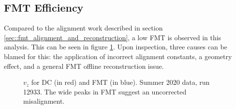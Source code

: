 \subsection{FMT Efficiency}
\label{ssec::fmt_efficiency}
    Compared to the alignment work described in section \ref{sec::fmt_alignment_and_reconstruction}, a low FMT is observed in this analysis.
    This can be seen in figure \ref{fig::vz_012933}.
    Upon inspection, three causes can be blamed for this: the application of incorrect alignment constants, a geometry effect, and a general FMT offline reconstruction issue.

    \begin{figure}[b!]
        \centering{}
        \caption[$v_z$ for DC and FMT, run 12933]{$v_z$ for DC (in red) and FMT (in blue). Summer 2020 data, run 12933. The wide peaks in FMT suggest an uncorrected misalignment.}
        \label{fig::vz_012933}
    \end{figure}

    
    
    
    
